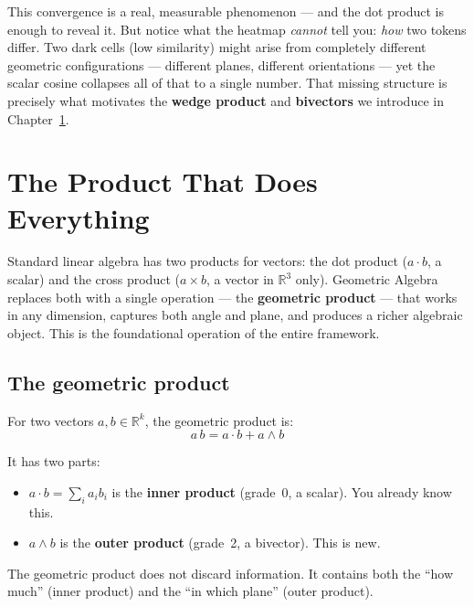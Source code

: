 \documentclass[11pt, twoside, openright]{memoir}
\newcommand{\gp}{\,}              %
\newcommand{\ip}{\cdot}           %
\newcommand{\op}{\wedge}          %
\numberwithin{equation}{chapter}
\begin{document}
\begin{tryit}
This convergence is a real, measurable phenomenon --- and the dot
product is enough to reveal it.  But notice what the heatmap
\emph{cannot} tell you: \emph{how} two tokens differ.  Two dark cells
(low similarity) might arise from completely different geometric
configurations --- different planes, different orientations --- yet the
scalar cosine collapses all of that to a single number.  That missing
structure is precisely what motivates the \textbf{wedge product} and
\textbf{bivectors} we introduce in Chapter~\ref{chap:geometric-product}.
\end{tryit}


\chapter{The Product That Does Everything}
\label{chap:geometric-product}

\begin{whycare}
Standard linear algebra has two products for vectors: the dot product
($a \ip b$, a scalar) and the cross product ($a \times b$, a vector in
$\mathbb{R}^3$ only).  Geometric Algebra replaces both with a single
operation --- the \textbf{geometric product} --- that works in any
dimension, captures both angle and plane, and produces a richer algebraic
object.  This is the foundational operation of the entire framework.
\end{whycare}

\section{The geometric product}

For two vectors $a, b \in \mathbb{R}^k$, the geometric product is:
\begin{equation}
  \boxed{a \gp b = a \ip b + a \op b}
\end{equation}

It has two parts:
\begin{itemize}[nosep]
\item $a \ip b = \sum_i a_i b_i$ is the \textbf{inner product}
  (grade~0, a scalar).  You already know this.
\item $a \op b$ is the \textbf{outer product} (grade~2, a bivector).
  This is new.
\end{itemize}

The geometric product does not discard information.  It contains both the
``how much'' (inner product) and the ``in which plane'' (outer product).
\end{document}
